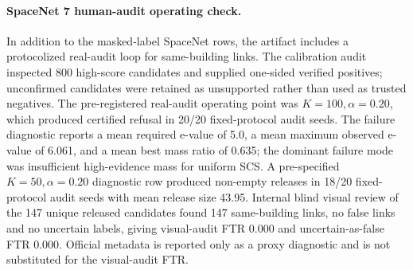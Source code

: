\documentclass[11pt]{article}
\begin{document}
\begin{table}[h]
\centering
\caption{Seed variability and FTR uncertainty for the primary rows. Intervals are seed bootstraps over the 20 fixed split seeds; they summarize run-to-run variability and are not independent Bernoulli confidence intervals over released links.}
\small
{}
\end{table}

\paragraph{SpaceNet 7 human-audit operating check.}
In addition to the masked-label SpaceNet rows, the artifact includes a protocolized real-audit loop for same-building links.
The calibration audit inspected 800 high-score candidates and supplied one-sided verified positives; unconfirmed candidates were retained as unsupported rather than used as trusted negatives.
The pre-registered real-audit operating point was \(K=100,\alpha=0.20\), which produced certified refusal in 20/20 fixed-protocol audit seeds.
The failure diagnostic reports a mean required e-value of 5.0, a mean maximum observed e-value of 6.061, and a mean best mass ratio of 0.635; the dominant failure mode was insufficient high-evidence mass for uniform SCS.
A pre-specified \(K=50,\alpha=0.20\) diagnostic row produced non-empty releases in 18/20 fixed-protocol audit seeds with mean release size 43.95.
Internal blind visual review of the 147 unique released candidates found 147 same-building links, no false links and no uncertain labels, giving visual-audit FTR 0.000 and uncertain-as-false FTR 0.000.
Official metadata is reported only as a proxy diagnostic and is not substituted for the visual-audit FTR.
\end{document}
